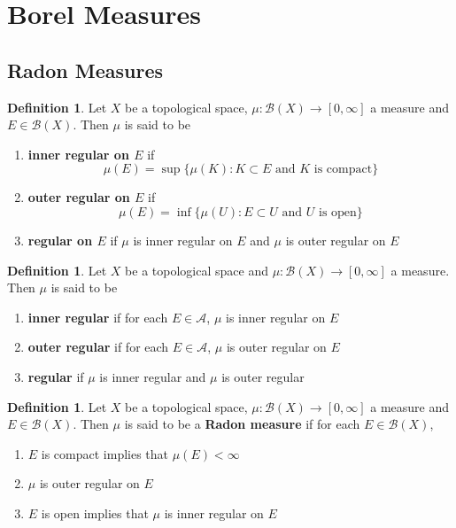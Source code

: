 \documentclass[12pt]{amsart}
\theoremstyle{definition}
\newtheorem{defn}[definition]{Definition}
\newcommand{\MA}{\mathcal{A}}
\newcommand{\MB}{\mathcal{B}}
\newcommand{\RG}{[0,\infty]}
\newcommand{\ld}[1]{\label{defn:#1}}
\begin{document}
	
	
	

	
	
	
	\newpage
	\section{Borel Measures}
	
	\subsection{Radon Measures}
	
	\begin{defn} \ld{00000} 
	Let $X$ be a topological space, $\mu: \MB(X) \rightarrow \RG$ a measure and $E \in \MB(X)$. Then $\mu$ is said to be 
	\begin{enumerate}
	\item \textbf{inner regular on $E$} if
	$$\mu(E) = \sup \{ \mu(K): K \subset E \text{ and $K$ is compact}\}$$
	\item \textbf{outer regular on $E$} if
	$$\mu(E) = \inf \{ \mu(U): E \subset U \text{ and $U$ is open}\}$$
	\item \textbf{regular on $E$} if $\mu$ is inner regular on $E$ and $\mu$ is outer regular on $E$
	\end{enumerate}
	\end{defn}
	
	\begin{defn} \ld{00000} 
	Let $X$ be a topological space and $\mu: \MB(X) \rightarrow \RG$ a measure. Then $\mu$ is said to be 
	\begin{enumerate}
	\item  \textbf{inner regular} if for each $E \in \MA$, $\mu$ is inner regular on $E$
	\item  \textbf{outer regular} if for each $E \in \MA$, $\mu$ is outer regular on $E$
	\item  \textbf{regular} if $\mu$ is inner regular and $\mu$ is outer regular
	\end{enumerate}
	\end{defn}
	
	\begin{defn} \ld{00000} 
	Let $X$ be a topological space, $\mu: \MB(X) \rightarrow \RG$ a measure and $E \in \MB(X)$. Then $\mu$ is said to be a \textbf{Radon measure} if for each $E \in \MB(X)$, 
	\begin{enumerate}
	\item $E$ is compact implies that $\mu(E) < \infty$
	\item $\mu$ is outer regular on $E$
	\item $E$ is open implies that $\mu$ is inner regular on $E$
	\end{enumerate}
	\end{defn}
\end{document}
